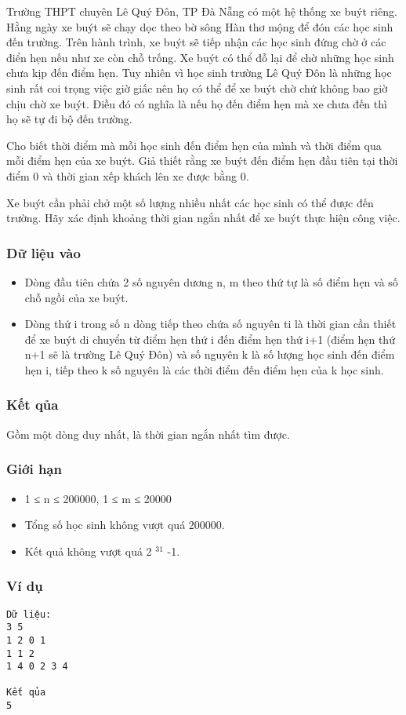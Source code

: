 



   Trường THPT chuyên Lê Quý Đôn, TP Đà Nẵng có một hệ thống xe buýt riêng. Hằng ngày xe buýt sẽ chạy dọc theo bờ sông Hàn thơ mộng để đón các học sinh đến trường. Trên hành trình, xe buýt sẽ   tiếp nhận các học sinh đứng chờ ở các điển hẹn nếu như xe còn chỗ trống. Xe buýt có thể đỗ lại để chờ những học sinh chưa kịp đến điểm hẹn. Tuy nhiên vì học sinh trường Lê Quý Đôn là những học sinh rất   coi trọng việc giờ giấc nên họ có thể để xe buýt chờ chứ không bao giờ chịu chờ xe buýt. Điều đó có nghĩa là nếu họ đến điểm hẹn mà xe chưa đến thì họ sẽ tự đi bộ đến trường.  

   Cho biết thời điểm mà mỗi học sinh đến điểm hẹn của mình và thời điểm qua mỗi điểm hẹn của xe buýt. Giả thiết rằng xe buýt đến điểm hẹn đầu tiên tại thời điểm 0 và thời gian xếp khách lên xe được bằng   0.  

   Xe buýt cần phải chở một số lượng nhiều nhất các học sinh có thể được đến trường. Hãy xác định khoảng thời gian ngắn nhất để xe buýt thực hiện công việc.  

\subsubsection{   Dữ liệu vào  }
\begin{itemize}
	\item     Dòng đầu tiên chứa 2 số nguyên dương n, m theo thứ tự là số điểm hẹn và số chỗ ngồi của xe buýt.   
	\item     Dòng thứ i trong số n dòng tiếp theo chứa số nguyên ti là thời gian cần thiết để xe buýt di chuyển từ điểm hẹn thứ i đến điểm hẹn thứ i+1 (điểm hẹn thứ n+1 sẽ là trường Lê Quý Đôn) và số nguyên k là số   lượng học sinh đến điểm hẹn i, tiếp theo k số nguyên là các thời điểm đến điểm hẹn của k học sinh.   
\end{itemize}

\subsubsection{   Kết qủa  }

   Gồm một dòng duy nhất, là thời gian ngắn nhất tìm được.  

\subsubsection{   Giới hạn  }
\begin{itemize}
	\item     1 ≤ n ≤ 200000, 1 ≤ m ≤ 20000   
	\item     Tổng số học sinh không vượt quá 200000.   
	\item     Kết quả không vượt quá 2    $^     31    $    -1.   
\end{itemize}

\subsubsection{   Ví dụ  }
\begin{verbatim}
Dữ liệu:
3 5
1 2 0 1
1 1 2
1 4 0 2 3 4

Kết qủa
5
\end{verbatim}